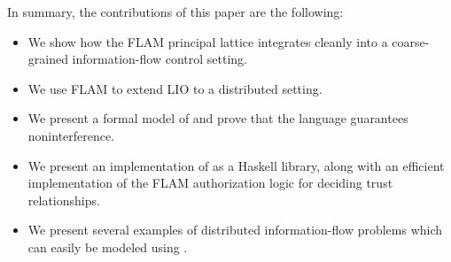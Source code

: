 



In summary, the contributions of this paper are the following:
\begin{itemize}
    \item We show how the FLAM principal lattice integrates cleanly into a coarse-grained information-flow control setting.
    \item We use FLAM to extend LIO to a distributed setting.
    \item We present a formal model of \lang{} and prove that the language guarantees noninterference.
    \item We present an implementation of \lang{} as a Haskell library, along with an efficient implementation of the FLAM authorization logic for deciding trust relationships.
    \item We present several examples of distributed information-flow problems which can easily be modeled using \lang.
\end{itemize}


